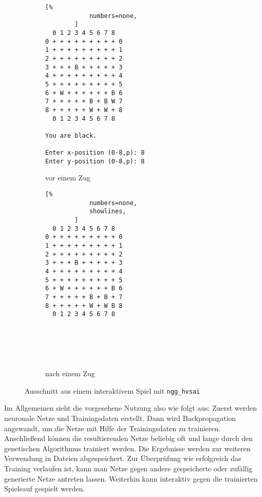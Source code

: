 \begin{figure}
    \centering

    \begin{subfigure}[t]{0.45\textwidth}
        \begin{lstlisting}[%
            numbers=none,
        ]
  0 1 2 3 4 5 6 7 8 
0 + + + + + + + + + 0
1 + + + + + + + + + 1
2 + + + + + + + + + 2
3 + + + B + + + + + 3
4 + + + + + + + + + 4
5 + + + + + + + + + 5
6 + W + + + + + + B 6
7 + + + + + B + B W 7
8 + + + + + W + W + 8
  0 1 2 3 4 5 6 7 8 

You are black.

Enter x-position (0-8,p): 8
Enter y-position (0-8,p): 8
        \end{lstlisting}
        \caption{vor einem Zug}
    \end{subfigure}
    \quad
    \begin{subfigure}[t]{0.35\textwidth}
        \begin{lstlisting}[%
            numbers=none,
            showlines,
        ]
  0 1 2 3 4 5 6 7 8 
0 + + + + + + + + + 0
1 + + + + + + + + + 1
2 + + + + + + + + + 2
3 + + + B + + + + + 3
4 + + + + + + + + + 4
5 + + + + + + + + + 5
6 + W + + + + + + B 6
7 + + + + + B + B + 7
8 + + + + + W + W B 8
  0 1 2 3 4 5 6 7 8 




 
        \end{lstlisting}
        \caption{nach einem Zug}
    \end{subfigure}
    \caption{Ausschnitt aus einem interaktivem Spiel mit \texttt{ngg\_hvsai}}
    \label{fig:ngg_hvsai}
 \end{figure}

Im Allgemeinen sieht die vorgesehene Nutzung also wie folgt aus: Zuerst werden
neuronale Netze und Trainingsdaten erstellt.  Dann wird Backpropagation
angewandt, um die Netze mit Hilfe der Trainingsdaten zu trainieren.
Anschließend können die resultierenden Netze beliebig oft und lange durch den
genetischen Algorithmus trainiert werden. Die Ergebnisse werden zur weiteren
Verwendung in Dateien abgespeichert.
Zur Überprüfung wie erfolgreich das Training verlaufen ist, kann man Netze
gegen andere gespeicherte oder zufällig generierte Netze antreten lassen.
Weiterhin kann interaktiv gegen die trainierten Spieleauf gespielt werden.
